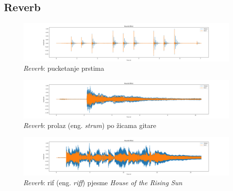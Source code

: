 \documentclass[times, utf8, seminar, numeric]{fer}
\begin{document}
\subsection{Reverb}
\begin{figure}[!htb]
	\centerline{\includegraphics[width=1.75\textwidth]{reverb_finger-snapping.png}}
	\caption{\textit{Reverb}: pucketanje prstima}
	\label{fig}
\end{figure}
\begin{figure}[!htb]
	\centerline{\includegraphics[width=1.75\textwidth]{reverb_strum.png}}
	\caption{\textit{Reverb}: prolaz (eng. \textit{strum}) po žicama gitare}
	\label{fig}
\end{figure}
\begin{figure}[!htb]
	\centerline{\includegraphics[width=1.75\textwidth]{reverb_rising-sun.png}}
	\caption{\textit{Reverb}: rif (eng. \textit{riff}) pjesme \textit{House of the Rising Sun}}
	\label{fig}
\end{figure}

\pagebreak
\end{document}
